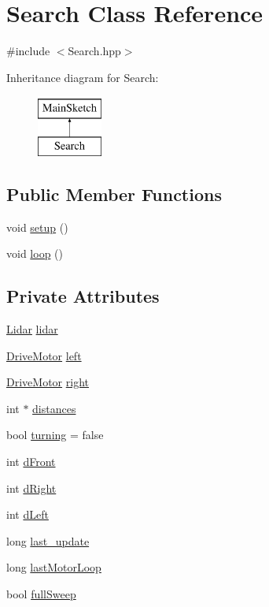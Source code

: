 \hypertarget{classSearch}{\section{Search Class Reference}
\label{classSearch}
}


{\ttfamily \#include $<$Search.\-hpp$>$}

Inheritance diagram for Search\-:\begin{figure}[H]
\begin{center}
\leavevmode
\includegraphics[height=2.000000cm]{classSearch}
\end{center}
\end{figure}
\subsection*{Public Member Functions}
\begin{DoxyCompactItemize}
\item 
void \hyperlink{classSearch_ad5de8c844478b7f0903d724236fd12ad}{setup} ()
\item 
void \hyperlink{classSearch_a75f9358f4551ee9ed0d750eac8fd479e}{loop} ()
\end{DoxyCompactItemize}
\subsection*{Private Attributes}
\begin{DoxyCompactItemize}
\item 
\hyperlink{classLidar}{Lidar} \hyperlink{classSearch_ad1209571d5e6cb4c53494549d8ec4ac6}{lidar}
\item 
\hyperlink{classDriveMotor}{Drive\-Motor} \hyperlink{classSearch_ad1df1ee1c5afbeb2767a4c1e064e7318}{left}
\item 
\hyperlink{classDriveMotor}{Drive\-Motor} \hyperlink{classSearch_a7f0e23cc5c8aa635fbe7f5b4c8e30eb0}{right}
\item 
int $\ast$ \hyperlink{classSearch_acae7260fec1cd49350860f94955b1e63}{distances}
\item 
bool \hyperlink{classSearch_aef5f5e911426d02067e2ac01e5549f1e}{turning} = false
\item 
int \hyperlink{classSearch_a443c7d18e6cfd0d114f7e2c2b1495bec}{d\-Front}
\item 
int \hyperlink{classSearch_a376def82b93387197752cc169ddf060e}{d\-Right}
\item 
int \hyperlink{classSearch_aeab525e9821cdb2dc5ed996a207d9084}{d\-Left}
\item 
long \hyperlink{classSearch_ac5a0e7842cdfec65c8af8fd2dd0d4dcc}{last\-\_\-update}
\item 
long \hyperlink{classSearch_af73bd725381f47afa3bf6af64d39f3b6}{last\-Motor\-Loop}
\item 
bool \hyperlink{classSearch_a113ce5d7076372bbe5041749f42a7ee3}{full\-Sweep}
\end{DoxyCompactItemize}


